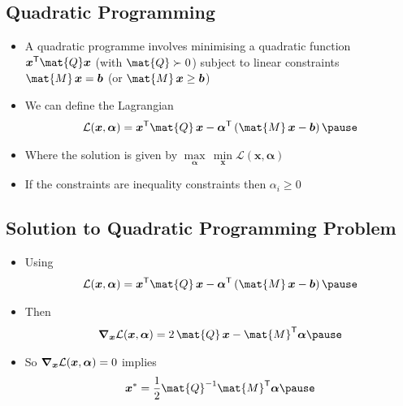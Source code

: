 
\begin{slide}
\section[-2]{Quadratic Programming}

\begin{PauseHighLight}
  \begin{itemize}
  \item A quadratic programme involves minimising a quadratic function
    $\bm{x}^\tr \mat{Q} \bm{x}$ (with $\mat{Q}\succ 0$) subject to
    linear constraints $\mat{M}\,\bm{x} = \bm{b}$ (or
    $\mat{M}\,\bm{x} \geq \bm{b}$)\pause
  \item We can define the Lagrangian
    \begin{align*}
      \mathcal{L}(\bm{x},\bm{\alpha}) = \bm{x}^\tr \mat{Q}\, \bm{x} -
      \bm{\alpha}^\tr \left( \mat{M}\,\bm{x} - \bm{b}\right)\pause
    \end{align*}
  \item Where the solution is given by $\max\limits_{\bm{\alpha}} \,
    \min\limits_{\bm{x}}  \mathcal{L}(\bm{x},\bm{\alpha})$\pause
  \item If the constraints are inequality constraints then
    $\alpha_i\geq0$\pause
  \end{itemize}
\end{PauseHighLight}

\end{slide}


\begin{slide}
\section{Solution to Quadratic Programming Problem}

\begin{PauseHighLight}
  \begin{itemize}
  \item Using
    \begin{align*}
      \mathcal{L}(\bm{x},\bm{\alpha}) = \bm{x}^\tr \mat{Q}\, \bm{x} -
      \bm{\alpha}^\tr \left( \mat{M}\,\bm{x} - \bm{b}\right)\pause
    \end{align*}
  \item Then
    \begin{align*}
      \grad_{\bm{x}} \mathcal{L}(\bm{x},\bm{\alpha}) =  2\, \mat{Q}\,
      \bm{x} - \mat{M}^\tr \bm{\alpha}\pause
    \end{align*}
  \item So $\bm{\nabla}_{\bm{x}} \mathcal{L}(\bm{x},\bm{\alpha}) = 0$
    implies
    \begin{align*}
      \bm{x}^* = \frac{1}{2} \mat{Q}^{-1} \mat{M}^\tr \bm{\alpha}\pause
    \end{align*}
  \end{itemize}
\end{PauseHighLight}

\end{slide}

